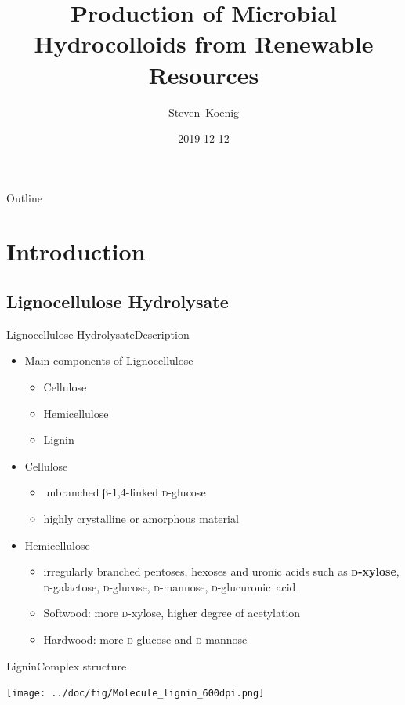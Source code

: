 \documentclass[mathserif]{beamer}
\title[\EPS{}s from \LCH{}] %
{Production of Microbial Hydrocolloids from Renewable Resources}
\author{Steven~Koenig}
\institute[TUM-CS, CBR] %
{Chair of Chemistry of Biogenic Resources\\
Technische Universität München}
\date[] %
{2019-12-12}
\newcommand{\LCH}{Lignocellulose Hydrolysate}
\newcommand{\glc}{\textsc{d}-glu\-cose}
\newcommand{\glcua}{\textsc{d}-glu\-cu\-ron\-ic~acid}
\newcommand{\xyl}{\textsc{d}-xy\-lose}
\newcommand{\man}{\textsc{d}-man\-nose}
\newcommand{\gal}{\textsc{d}-ga\-lac\-tose}
\begin{document}
\titlefontii
\begin{frame}
  \titlepage
\end{frame}

\begin{frame}{Outline}
  \tableofcontents[pausesections]
\end{frame}

\section{Introduction}

\subsection{\LCH{}}

\begin{frame}{\LCH{}}{Description}
	\begin{itemize}
		\item Main components of Lignocellulose
		\begin{itemize}
			\item Cellulose
			\item Hemicellulose
			\item Lignin
		\end{itemize}
		\pause
		\item Cellulose
		\begin{itemize}
			\item unbranched β-1,4-linked \glc{}
			\item highly crystalline or amorphous material
		\end{itemize}
		\pause
		\item Hemicellulose
		\begin{itemize}
			\item irregularly branched pentoses, hexoses and uronic acids such as \textbf{\xyl{}}, \gal{}, \glc{}, \man{}, \glcua{}
			\item Softwood: more \xyl{}, higher degree of acetylation
			\item Hardwood: more \glc{} and \man{}
		\end{itemize}
	\end{itemize}
\end{frame}

\begin{frame}{Lignin}{Complex structure}
	\begin{center}
		\texttt{[image: ../doc/fig/Molecule\_lignin\_600dpi.png]}
	\end{center}
\end{frame}
\end{document}

